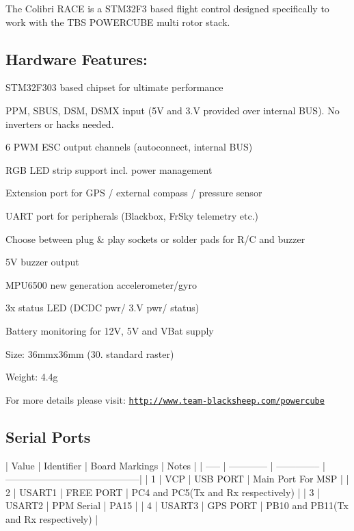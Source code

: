 The Colibri R\+A\+C\+E is a S\+T\+M32\+F3 based flight control designed specifically to work with the T\+B\+S P\+O\+W\+E\+R\+C\+U\+B\+E multi rotor stack.

\subsection*{Hardware Features\+:}


\begin{DoxyItemize}
\item S\+T\+M32\+F303 based chipset for ultimate performance
\item P\+P\+M, S\+B\+U\+S, D\+S\+M, D\+S\+M\+X input (5\+V and 3.\+V provided over internal B\+U\+S). No inverters or hacks needed.
\item 6 P\+W\+M E\+S\+C output channels (autoconnect, internal B\+U\+S)
\begin{DoxyItemize}
\item R\+G\+B L\+E\+D strip support incl. power management
\item Extension port for G\+P\+S / external compass / pressure sensor
\item U\+A\+R\+T port for peripherals (Blackbox, Fr\+Sky telemetry etc.)
\item Choose between plug \& play sockets or solder pads for R/\+C and buzzer
\item 5\+V buzzer output
\item M\+P\+U6500 new generation accelerometer/gyro
\item 3x status L\+E\+D (D\+C\+D\+C pwr/ 3.\+V pwr/ status)
\item Battery monitoring for 12\+V, 5\+V and V\+Bat supply
\item Size\+: 36mmx36mm (30.\+5mm standard raster)
\item Weight\+: 4.\+4g
\end{DoxyItemize}

For more details please visit\+: \href{http://www.team-blacksheep.com/powercube}{\tt http\+://www.\+team-\/blacksheep.\+com/powercube}
\end{DoxyItemize}

\subsection*{Serial Ports}

\begin{DoxyVerb}| Value | Identifier   | Board Markings | Notes                                     |
| ----- | ------------ | -------------- | ------------------------------------------|
| 1     | VCP          | USB PORT       | Main Port For MSP                         |
| 2     | USART1       | FREE PORT      | PC4 and PC5(Tx and Rx respectively)       |
| 3     | USART2       | PPM Serial     | PA15                                      |
| 4     | USART3       | GPS PORT       | PB10 and PB11(Tx and Rx respectively)     |
\end{DoxyVerb}


